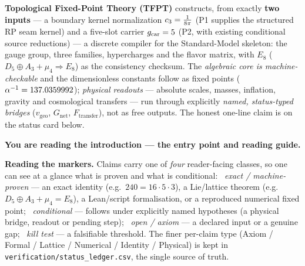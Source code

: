 
\maketitle
\vspace{-0.8cm}

\begin{keyboxnb}
\textbf{Topological Fixed-Point Theory (TFPT)} constructs, from exactly \textbf{two inputs} --- a boundary
kernel normalization $c_3=\tfrac1{8\pi}$ (P1 supplies the structured RP seam kernel)
and a five-slot carrier $g_{\mathrm{car}}=5$ (P2, with existing conditional source reductions) --- a discrete compiler for
the Standard-Model skeleton: the gauge group, three families, hypercharges and the flavor matrix, with
$E_8$ ($D_5\oplus A_3+\mu_4\Rightarrow E_8$) as the consistency checksum. The \emph{algebraic core is
machine-checkable} and the dimensionless constants follow as fixed points ($\alpha^{-1}=137.0359992$);
\emph{physical readouts} --- absolute scales, masses, inflation, gravity and cosmological transfers ---
run through explicitly \emph{named, status-typed bridges} ($v_{\mathrm{geo}}$, $G_{\mathrm{net}}$,
$F_{\mathrm{transfer}}$), not as free outputs. The honest one-line claim is on the status card below.
\end{keyboxnb}


\noindent\textbf{You are reading the \textbf{introduction} --- the entry point and reading guide.}


\TFPTbadges
\TFPTclaimstack[none]


\tableofcontents

\noindent\textbf{Reading the markers.} Claims carry one of \emph{four} reader-facing classes, so one can
see at a glance what is proven and what is conditional:
\mE\ \emph{exact / machine-proven} --- an exact identity (e.g.\ $240=16\cdot5\cdot3$), a Lie/lattice
theorem (e.g.\ $D_5{\oplus}A_3{+}\mu_4{=}E_8$), a Lean/script formalisation, or a reproduced numerical
fixed point;
\mC\ \emph{conditional} --- follows under explicitly named hypotheses (a physical bridge, readout or
pending step);
\mO\ \emph{open / axiom} --- a declared input or a genuine gap;
\mX\ \emph{kill test} --- a falsifiable threshold.
The finer per-claim type (Axiom / Formal / Lattice / Numerical / Identity / Physical) is kept in
\texttt{verification/status\_ledger.csv}, the single source of truth.

